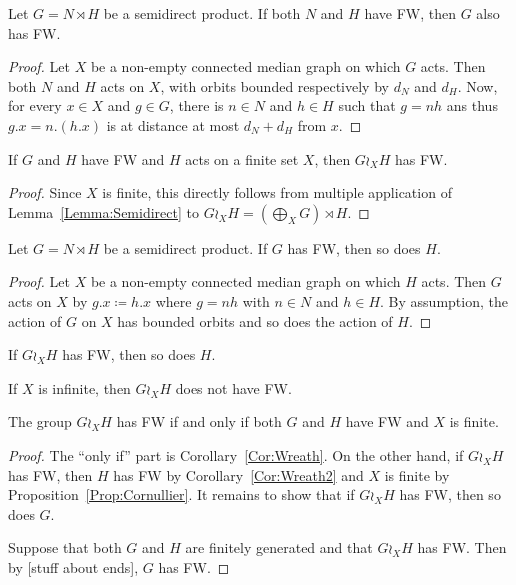 \begin{lem}\label{Lemma:Semidirect}
Let $G=N\rtimes H$ be a semidirect product.
If both $N$ and $H$ have FW, then $G$ also has FW.
\end{lem}
\begin{proof}
Let $X$ be a non-empty connected median graph on which $G$ acts.
Then both $N$ and $H$ acts on $X$, with orbits bounded respectively by $d_N$ and $d_H$.
Now, for every $x\in X$ and $g\in G$, there is $n\in N$ and $h\in H$ such that $g=nh$ ans thus $g.x=n.(h.x)$ is at distance at most $d_N+d_H$ from $x$.
\end{proof}
\begin{cor}\label{Cor:Wreath}
If $G$ and $H$ have FW and $H$ acts on a finite set $X$, then $G\wr_X H$ has FW.
\end{cor}
\begin{proof}
Since $X$ is finite, this directly follows from multiple application of Lemma~\ref{Lemma:Semidirect} to $G\wr_X H=(\bigoplus_X G)\rtimes H$.
\end{proof}
\begin{lem}
Let $G=N\rtimes H$ be a semidirect product.
If $G$ has FW, then so does $H$.
\end{lem}
\begin{proof}
Let $X$ be a non-empty connected median graph on which $H$ acts.
Then $G$ acts on $X$ by $g.x\coloneqq h.x$ where $g=nh$ with $n\in N$ and $h\in H$.
By assumption, the action of $G$ on $X$ has bounded orbits and so does the action of $H$.
\end{proof}
\begin{cor}\label{Cor:Wreath2}
If $G\wr_X H$ has FW, then so does $H$.
\end{cor}
\begin{prop}[Cornullier]\label{Prop:Cornullier}
If $X$ is infinite, then $G\wr_X H$ does not have FW.
\end{prop}
\begin{thm}[L-S]
The group $G\wr_X H$ has FW if and only if both $G$ and $H$ have FW and $X$ is finite.
\end{thm}
\begin{proof}
The ``only if'' part is Corollary~\ref{Cor:Wreath}.
On the other hand, if $G\wr_X H$ has FW, then $H$ has FW by Corollary~\ref{Cor:Wreath2} and $X$ is finite by Proposition~\ref{Prop:Cornullier}.
It remains to show that if $G\wr_X H$ has FW, then so does $G$.

Suppose that both $G$ and $H$ are finitely generated and that $G\wr_X H$ has FW. Then by [stuff about ends], $G$ has FW.
\end{proof}